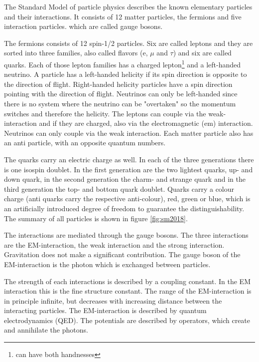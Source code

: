 The Standard Model of particle physics describes the known elementary particles and their interactions. It consists of 12 matter particles, the fermions
and five interaction particles. which are called gauge bosons.

The fermions consists of 12 spin-1/2 particles. Six are called leptons and they are sorted into three families, also called flavors (e, $\mu$ and $\tau$) and six are called quarks. Each of those lepton families has a charged lepton\footnote{can have both handnesses} and a left-handed neutrino.
A particle has a left-handed helicity if its spin direction is opposite to the direction of flight. Right-handed helicity particles have a spin direction pointing with the direction of flight.
Neutrinos can only be left-handed since there is no system where the neutrino can be "overtaken" so the momentum switches and therefore the helicity.
The leptons can couple via the weak-interaction and if they are charged, also via the electromagnetic (em) interaction. Neutrinos can only couple via the weak interaction.
Each matter particle also has an anti particle, with an opposite quantum numbers.

The quarks carry an electric charge as well. In each of the three generations there is one isospin doublet. In the first generation are the two lightest quarks,
up- and down quark, in the second generation the charm- and strange quark and
in the third generation the top- and bottom quark doublet.
Quarks carry a colour charge (anti quarks carry the respective anti-colour), red, green or blue, which is an artificially introduced degree of freedom to guarantee the distinguishability.
The summary of all particles is shown in figure \ref{fig:sm2018}.

The interactions are mediated through the gauge bosons.
The three interactions are the EM-interaction,
the weak interaction and the strong interaction. Gravitation does not make a significant contribution.
The gauge boson of the EM-interaction is the photon which is exchanged between particles.

The strength of each interactions is
described by a coupling constant. In the EM interaction this is the
fine structure constant\cite{alphas}. The range of the EM-interaction is in principle
infinite, but decreases with increasing distance between the interacting particles.
The EM-interaction is described by quantum electrodynamics (QED).
The potentials are described by operators, which create and annihilate the photons.

